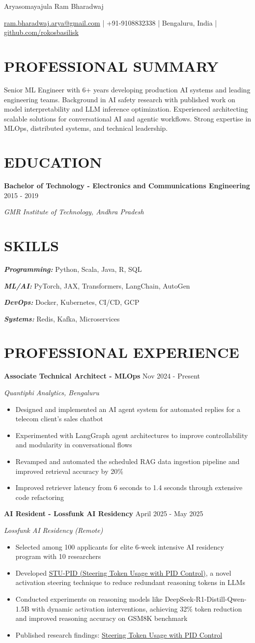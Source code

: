 \documentclass[fontsize=11pt]{article}
\newcommand{\MyName}[1]{
    \Huge \usefont{OT1}{phv}{b}{n} \hfill #1
    \par \normalsize \normalfont}
\newcommand{\NewPart}[1]{\section*{\uppercase{#1}}}
\newcommand{\SkillsEntry}[2]{
    \noindent\textbf{\textit{#1}} \hspace{1.5em} #2 \par}
\newcommand{\EducationEntry}[4]{
    \noindent \textbf{#1} \hfill {#2} \par
    \noindent \textit{#3} \par
    \noindent \small #4
    \normalsize \par}
\newcommand{\WorkEntry}[4]{
    \noindent \textbf{#1} \hfill {#2} \par
    \noindent \textit{#3} \par
    \noindent \small #4
    \normalsize \par}
\newcommand{\AboutEntry}[1]{
    \noindent #1 \par}
\begin{document}
\MyName{Aryasomayajula Ram Bharadwaj}
\bigskip

{\small \hfill \href{mailto:ram.bharadwaj.arya@gmail.com}{ram.bharadwaj.arya@gmail.com} | +91-9108832338 | Bengaluru, India | \href{https://github.com/rokosbasilisk}{github.com/rokosbasilisk}}

\NewPart{PROFESSIONAL SUMMARY}
\AboutEntry{Senior ML Engineer with 6+ years developing production AI systems and leading engineering teams. Background in AI safety research with published work on model interpretability and LLM inference optimization. Experienced architecting scalable solutions for conversational AI and agentic workflows. Strong expertise in MLOps, distributed systems, and technical leadership.}

\NewPart{EDUCATION}
\EducationEntry
{Bachelor of Technology - Electronics and Communications Engineering}
{2015 - 2019}
{GMR Institute of Technology, Andhra Pradesh}
{}

\NewPart{SKILLS}
\SkillsEntry{Programming:}{Python, Scala, Java, R, SQL}
\SkillsEntry{ML/AI:}{PyTorch, JAX, Transformers, LangChain, AutoGen}
\SkillsEntry{DevOps:}{Docker, Kubernetes, CI/CD, GCP}
\SkillsEntry{Systems:}{Redis, Kafka, Microservices}

\NewPart{PROFESSIONAL EXPERIENCE}
\WorkEntry
{Associate Technical Architect - MLOps}
{Nov 2024 - Present}
{Quantiphi Analytics, Bengaluru}
{%
\begin{itemize}
\item Designed and implemented an AI agent system for automated replies for a telecom client's sales chatbot
\item Experimented with LangGraph agent architectures to improve controllability and modularity in conversational flows
\item Revamped and automated the scheduled RAG data ingestion pipeline and improved retrieval accuracy by 20\%
\item Improved retriever latency from 6 seconds to 1.4 seconds through extensive code refactoring
\end{itemize}}

\WorkEntry
{AI Resident - Lossfunk AI Residency}
{April 2025 - May 2025}
{Lossfunk AI Residency (Remote)}
{%
\begin{itemize}
\item Selected among 100 applicants for elite 6-week intensive AI residency program with 10 researchers
\item Developed \href{https://github.com/rokosbasilisk/STU-PID}{STU-PID (Steering Token Usage with PID Control)}, a novel activation steering technique to reduce redundant reasoning tokens in LLMs
\item Conducted experiments on reasoning models like DeepSeek-R1-Distill-Qwen-1.5B with dynamic activation interventions, achieving 32\% token reduction and improved reasoning accuracy on GSM8K benchmark
\item Published research findings: \href{https://arxiv.org/abs/2506.18831}{Steering Token Usage with PID Control}
\end{itemize}}
\end{document}
